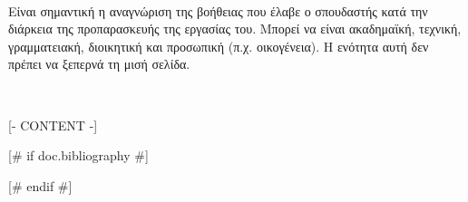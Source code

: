\documentclass[a4paper,11pt,oneside]{article}
\begin{document}
{\fontsize{12pt}{14pt}
}
\vspace{0.8cm}

\clearpage

\clearpage
\thispagestyle{empty}

\vspace*{2cm} %
\\[0.6cm]

{\fontsize{12pt}{14pt}
}
\vspace{0.8cm}

\clearpage

\clearpage
\thispagestyle{empty}

\vspace*{2cm} %


\vspace{1.5cm}

{\fontsize{12pt}{14pt}\selectfont
Είναι σημαντική η αναγνώριση της βοήθειας που έλαβε ο σπουδαστής κατά την διάρκεια της προπαρασκευής της εργασίας του. Μπορεί να είναι ακαδημαϊκή, τεχνική, γραμματειακή, διοικητική και προσωπική (π.χ. οικογένεια). Η ενότητα αυτή δεν πρέπει να ξεπερνά τη μισή σελίδα.
}

\vspace{2cm} %

\begin{flushright}
  {\fontsize{12pt}{14pt}}\\[0.3cm]
  {\fontsize{12pt}{14pt}}
\end{flushright}

\clearpage

\tableofcontents

[- CONTENT -]

[# if doc.bibliography #]
\newpage
{}

[# endif #]
\end{document}
